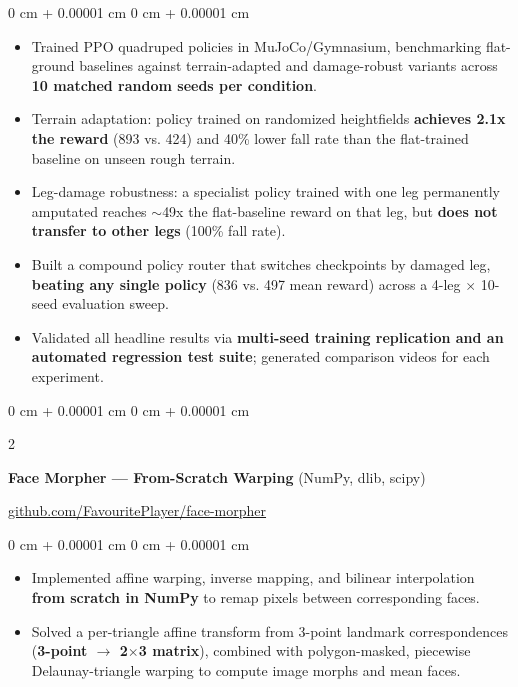 \documentclass[10pt, letterpaper]{article}
\newenvironment{highlights}{
    \begin{itemize}[
        topsep=0.3 cm,
        parsep=0.05 cm,
        partopsep=0pt,
        itemsep=0.02 cm,
        leftmargin=0 cm + 10pt
    ]
}{
    \end{itemize}
} %
\newenvironment{onecolentry}{
    \begin{adjustwidth}{
        0 cm + 0.00001 cm
    }{
        0 cm + 0.00001 cm
    }
}{
    \end{adjustwidth}
} %
\newenvironment{extendedtwocolentry}[2][]{
    \onecolentry
    \def\secondColumn{#2}
    \setcolumnwidth{\fill, 8 cm}
    \begin{paracol}{2}
}{
    \switchcolumn \raggedleft \secondColumn
    \end{paracol}
    \endonecolentry
}
\begin{document}
        \vspace{0.10 cm}
        \begin{onecolentry}
            \begin{highlights}
                \item Trained PPO quadruped policies in MuJoCo/Gymnasium, benchmarking flat-ground baselines against terrain-adapted and damage-robust variants across \textbf{10 matched random seeds per condition}.
                \item Terrain adaptation: policy trained on randomized heightfields \textbf{achieves 2.1x the reward} (893 vs. 424) and 40\% lower fall rate than the flat-trained baseline on unseen rough terrain.
                \item Leg-damage robustness: a specialist policy trained with one leg permanently amputated reaches $\sim$49x the flat-baseline reward on that leg, but \textbf{does not transfer to other legs} (100\% fall rate).
                \item Built a compound policy router that switches checkpoints by damaged leg, \textbf{beating any single policy} (836 vs. 497 mean reward) across a 4-leg $\times$ 10-seed evaluation sweep.
                \item Validated all headline results via \textbf{multi-seed training replication and an automated regression test suite}; generated comparison videos for each experiment.
            \end{highlights}
        \end{onecolentry}

        \begin{extendedtwocolentry}{
            \href{https://github.com/FavouritePlayer/face-morpher}{github.com/FavouritePlayer/face-morpher}
        }
            \textbf{Face Morpher — From-Scratch Warping} (NumPy, dlib, scipy)
        \end{extendedtwocolentry}

        \vspace{0.10 cm}
        \begin{onecolentry}
            \begin{highlights}
                \item Implemented affine warping, inverse mapping, and bilinear interpolation \textbf{from scratch in NumPy} to remap pixels between corresponding faces.
                \item Solved a per-triangle affine transform from 3-point landmark correspondences (\textbf{3-point $\rightarrow$ 2$\times$3 matrix}), combined with polygon-masked, piecewise Delaunay-triangle warping to compute image morphs and mean faces.
            \end{highlights}
        \end{onecolentry}
\end{document}
